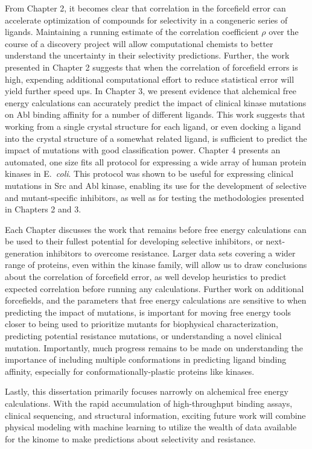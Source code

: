 \documentclass[phd,tocprelim]{cornell}
\begin{document}
From Chapter 2, it becomes clear that correlation in the forcefield error can accelerate optimization of compounds for selectivity in a congeneric series of ligands. Maintaining a running estimate of the correlation coefficient $\rho$ over the course of a discovery project will allow computational chemists to better understand the uncertainty in their selectivity predictions. Further, the work presented in Chapter 2 suggests that when the correlation of forcefield errors is high, expending additional computational effort to reduce statistical error will yield further speed ups. In Chapter 3, we present evidence that alchemical free energy calculations can accurately predict the impact of clinical kinase mutations on Abl binding affinity for a number of different ligands. This work suggests that working from a single crystal structure for each ligand, or even docking a ligand into the crystal structure of a somewhat related ligand, is sufficient to predict the impact of mutations with good classification power. Chapter 4 presents an automated, one size fits all protocol for expressing a wide array of human protein kinases in E.~\emph{coli}. This protocol was shown to be useful for expressing clinical mutations in Src and Abl kinase, enabling its use for the development of selective and mutant-specific inhibitors, as well as for testing the methodologies presented in Chapters 2 and 3. 

Each Chapter discusses the work that remains before free energy calculations can be used to their fullest potential for developing selective inhibitors, or next-generation inhibitors to overcome resistance. Larger data sets covering a wider range of proteins, even within the kinase family, will allow us to draw conclusions about the correlation of forcefield error, as well develop heuristics to predict expected correlation before running any calculations. Further work on additional forcefields, and the parameters that free energy calculations are sensitive to when predicting the impact of mutations, is important for moving free energy tools closer to being used to prioritize mutants for biophysical characterization, predicting potential resistance mutations, or understanding a novel clinical mutation. Importantly, much progress remains to be made on understanding the importance of including multiple conformations in predicting ligand binding affinity, especially for conformationally-plastic proteins like kinases. 

Lastly, this dissertation primarily focuses narrowly on alchemical free energy calculations. With the rapid accumulation of high-throughput binding assays, clinical sequencing, and structural information, exciting future work will combine physical modeling with machine learning to utilize the wealth of data available for the kinome to make predictions about selectivity and resistance. 
\end{document}
